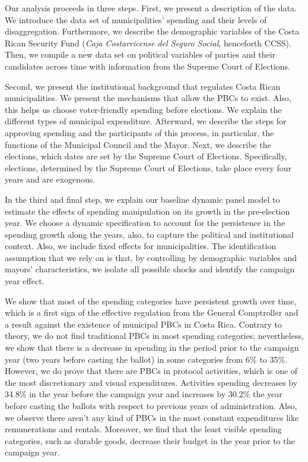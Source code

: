 Our analysis proceeds in three steps. First, we present a description of the data. We introduce the data set of municipalities' spending and their levels of disaggregation. Furthermore, we describe the demographic variables of the Costa Rican Security Fund (\textit{Caja Costarricense del Seguro Social}, henceforth CCSS). Then, we compile a new data set on political variables of parties and their candidates across time with information from the Supreme Court of Elections. 

Second, we present the institutional background that regulates Costa Rican municipalities. We present the mechanisms that allow the PBCs to exist. Also, this helps us choose voter-friendly spending before elections. We explain the different types of municipal expenditure. Afterward, we describe the steps for approving spending and the participants of this process, in particular, the functions of the Municipal Council and the Mayor. Next, we describe the elections, which dates are set by the Supreme Court of Elections. Specifically, elections, determined by the Supreme Court of Elections, take place every four years and are exogenous.

In the third and final step, we explain our baseline dynamic panel model to estimate the effects of spending manipulation on its growth in the pre-election year. We choose a dynamic specification to account for the persistence in the spending growth along the years, also, to capture the political and institutional context. Also, we include fixed effects for municipalities. The identification assumption that we rely on is that, by controlling by demographic variables and mayors' characteristics, we isolate all possible shocks and identify the campaign year effect. 

We show that most of the spending categories have persistent growth over time, which is a first sign of the effective regulation from the General Comptroller and a result against the existence of municipal PBCs in Costa Rica. Contrary to theory, we do not find traditional PBCs in most spending categories; nevertheless, we show that there is a decrease in spending in the period prior to the campaign year (two years before casting the ballot) in some categories from 6\% to 35\%. However, we do prove that there are PBCs in protocol activities, which is one of the most discretionary and visual expenditures. Activities spending decreases by 34.8\% in the year before the campaign year and increases by 30.2\% the year before casting the ballots with respect to previous years of administration. Also, we observe there aren't any kind of PBCs in the most constant expenditures like remunerations and rentals. Moreover, we find that the least visible spending categories, such as durable goods, decrease their budget in the year prior to the campaign year. 

